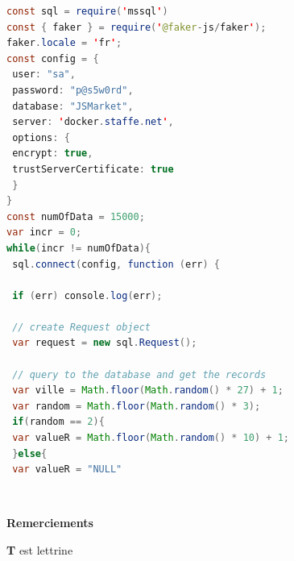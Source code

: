 \documentclass{rapportHenallux}
\begin{document}
\begin{lstlisting}[language=Java, title=test.sql]
const sql = require('mssql')
const { faker } = require('@faker-js/faker');
faker.locale = 'fr';
const config = {
 user: "sa",
 password: "p@s5w0rd",
 database: "JSMarket",
 server: 'docker.staffe.net',
 options: {
 encrypt: true,
 trustServerCertificate: true
 }
}
const numOfData = 15000;
var incr = 0;
while(incr != numOfData){
 sql.connect(config, function (err) {
 
 if (err) console.log(err);
 
 // create Request object
 var request = new sql.Request();
 
 // query to the database and get the records
 var ville = Math.floor(Math.random() * 27) + 1;
 var random = Math.floor(Math.random() * 3);
 if(random == 2){
 var valueR = Math.floor(Math.random() * 10) + 1;
 }else{
 var valueR = "NULL"
\end{lstlisting}

\newpage \thispagestyle{empty}
~~
\vspace{150px}

{\fontsize{24}{25}\selectfont \textbf{Remerciements}}
\vspace{10px}

\lettrine[findent=2pt]{\textbf{T}}{ }est lettrine 

\tabto{6cm} \lipsum[2-3]

\fairebibliographie

\newpage \listoffigures

\end{document}
